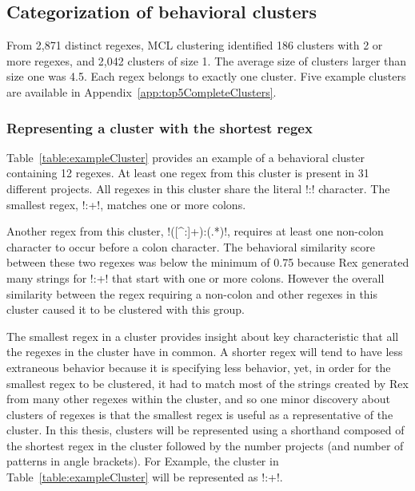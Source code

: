 \subsection{Categorization of behavioral clusters}
From 2,871 distinct regexes, MCL clustering identified 186 clusters with 2 or more regexes, and 2,042 clusters of size 1.
The average size of clusters larger than size one was 4.5.  Each regex belongs to exactly one cluster.  Five example clusters are available in Appendix~\ref{app:top5CompleteClusters}.



\subsubsection{Representing a cluster with the shortest regex}
Table~\ref{table:exampleCluster} provides an example of a behavioral cluster containing 12 regexes. At least one regex from this cluster is present in 31 different projects.  All regexes in this cluster share the literal \cverb!:! character. The smallest regex, \cverb!:+!,  matches one or more colons.

Another regex from this cluster, \cverb!([^:]+):(.*)!, requires at least one non-colon character to occur before a colon character.  The behavioral similarity score between these two regexes was below the minimum of 0.75 because Rex generated many strings for \cverb!:+! that start with one or more colons.  However the overall similarity between the regex requiring a non-colon and other regexes in this cluster caused it to be clustered with this group.

The smallest regex in a cluster provides insight about key characteristic that all the regexes in the cluster have in common.  A shorter regex will tend to have less extraneous behavior because it is specifying less behavior, yet, in order for the smallest regex to be clustered, it had to match most of the strings created by Rex from many other regexes within the cluster, and so one minor discovery about clusters of regexes is that {the smallest regex is useful as a representative of the cluster}.  In this thesis, clusters will be represented using a shorthand composed of the shortest regex in the cluster followed by the number projects (and number of patterns in angle brackets).  For Example, the cluster in Table~\ref{table:exampleCluster} will be represented as \cverb!:+!.

